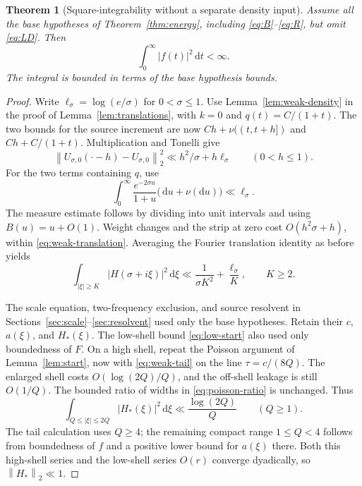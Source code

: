 \documentclass[11pt,letterpaper]{article}
\numberwithin{equation}{section}
\newtheorem{theorem}{Theorem}[section]
\theoremstyle{definition}
\theoremstyle{remark}
\newcommand{\dd}{\,\mathrm d}
\newcommand{\norm}[1]{\left\lVert#1\right\rVert}
\begin{document}
\begin{theorem}[Square-integrability without a separate density input]
\label{thm:weak-L2}
Assume all the base hypotheses of Theorem~\ref{thm:energy}, including
\eqref{eq:B}--\eqref{eq:R}, but omit \eqref{eq:LD}. Then
\begin{equation}\label{eq:unweighted-L2}
 \int_0^\infty |f(t)|^2\dd t<\infty.
\end{equation}
The integral is bounded in terms of the base hypothesis bounds.
\end{theorem}
\begin{proof}
Write $\ell_\sigma=\log(e/\sigma)$ for $0<\sigma\le1$.
Use Lemma~\ref{lem:weak-density} in the proof of
Lemma~\ref{lem:translations}, with $k=0$ and $q(t)=C/(1+t)$.
The two bounds for the source increment are now
$Ch+\nu((t,t+h])$ and $Ch+C/(1+t)$. Multiplication and Tonelli give
\begin{equation}\label{eq:weak-translation}
 \norm{U_{\sigma,0}(\cdot-h)-U_{\sigma,0}}_2^2
 \ll h^2/\sigma+h\ell_\sigma\qquad(0<h\le1).
\end{equation}
For the two terms containing $q$, use
\[
 \int_0^\infty\frac{e^{-2\sigma u}}{1+u}
       \bigl(\dd u+\nu(\mathrm du)\bigr)\ll\ell_\sigma.
\]
The measure estimate follows by dividing into unit intervals and using
$B(u)=u+O(1)$. Weight changes and the strip at zero cost
$O(h^2\sigma+h)$, within \eqref{eq:weak-translation}.
Averaging the Fourier translation identity as before yields
\begin{equation}\label{eq:weak-tail}
 \int_{|\xi|\ge K}|H(\sigma+i\xi)|^2\dd\xi
 \ll\frac1{\sigma K^2}+\frac{\ell_\sigma}{K},\qquad K\ge2.
\end{equation}

The scale equation, two-frequency exclusion, and source resolvent in
Sections~\ref{sec:scale}--\ref{sec:resolvent} used only the base hypotheses.
Retain their $c$, $a(\xi)$, and $H_*(\xi)$. The low-shell bound
\eqref{eq:low-start} also used only boundedness of $F$. On a high shell,
repeat the Poisson argument of Lemma~\ref{lem:start}, now with
\eqref{eq:weak-tail} on the line $\tau=c/(8Q)$. The enlarged shell costs
$O(\log(2Q)/Q)$, and the off-shell leakage is still $O(1/Q)$.
The bounded ratio of widths in \eqref{eq:poisson-ratio} is unchanged. Thus
\begin{equation}\label{eq:weak-start}
 \int_{Q\le|\xi|\le2Q}|H_*(\xi)|^2\dd\xi
 \ll\frac{\log(2Q)}Q\qquad(Q\ge1).
\end{equation}
The tail calculation uses $Q\ge4$; the remaining compact range
$1\le Q<4$ follows from boundedness of $f$ and a positive lower bound
for $a(\xi)$ there.
Both this high-shell series and the low-shell series $O(r)$ converge
dyadically, so $\norm{H_*}_2\ll1$.


\end{proof}
\end{document}
